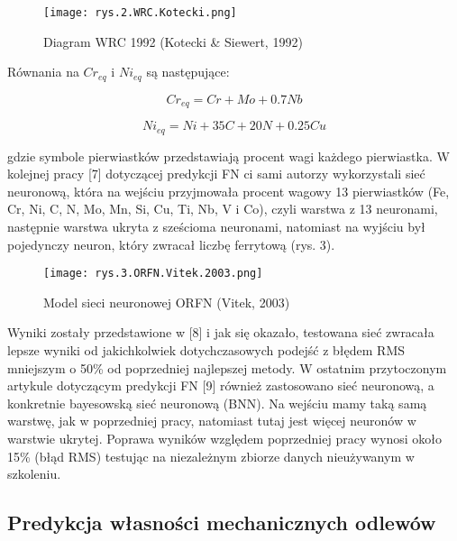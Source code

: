 \begin{figure}[h]
    \centering
    \texttt{[image: rys.2.WRC.Kotecki.png]}
    \caption{Diagram WRC 1992 (Kotecki \& Siewert, 1992)}
    \label{fig:mesh2}
\end{figure}

Równania na  $Cr_{eq}$ i $Ni_{eq}$ są następujące:

\begin{equation}
Cr_{eq} = Cr + Mo + 0.7Nb
\end{equation}

\begin{equation}
Ni_{eq} = Ni+35C+20N+0.25Cu
\end{equation}

gdzie symbole pierwiastków przedstawiają procent wagi każdego pierwiastka.
W kolejnej pracy [7] dotyczącej predykcji FN ci sami autorzy wykorzystali sieć neuronową, która na wejściu przyjmowała procent wagowy 13 pierwiastków (Fe, Cr, Ni, C, N, Mo, Mn, Si, Cu, Ti, Nb, V i Co), czyli warstwa z 13 neuronami, następnie warstwa ukryta z sześcioma neuronami, natomiast na wyjściu był pojedynczy neuron, który zwracał liczbę ferrytową (rys. 3).

\begin{figure}[h]
    \centering
    \texttt{[image: rys.3.ORFN.Vitek.2003.png]}
    \caption{Model sieci neuronowej ORFN (Vitek, 2003)}
    \label{fig:mesh3}
\end{figure}

Wyniki zostały przedstawione w [8] i jak się okazało, testowana sieć zwracała lepsze wyniki od jakichkolwiek dotychczasowych podejść z błędem RMS mniejszym o 50\% od poprzedniej najlepszej metody. 
    W ostatnim przytoczonym artykule dotyczącym predykcji FN [9] również zastosowano sieć neuronową, a konkretnie bayesowską sieć neuronową (BNN). Na wejściu mamy taką samą warstwę, jak w poprzedniej pracy, natomiast tutaj jest więcej neuronów w warstwie ukrytej. Poprawa wyników względem poprzedniej pracy wynosi około 15\% (błąd RMS) testując na niezależnym zbiorze danych nieużywanym w szkoleniu.

\subsection{Predykcja własności mechanicznych odlewów}

